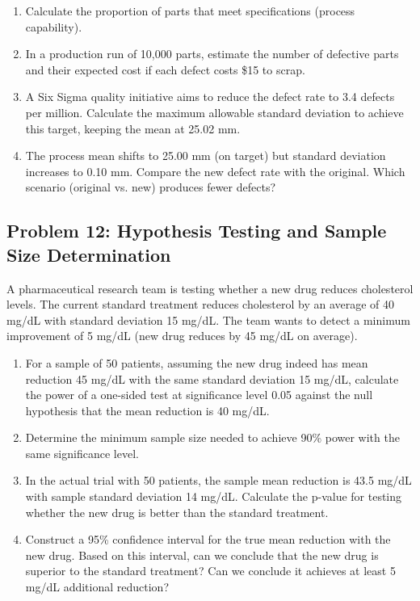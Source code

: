 \documentclass[12pt]{article}
\begin{document}
\begin{enumerate}[label=(\alph*)]
\item Calculate the proportion of parts that meet specifications (process capability).

\item In a production run of 10,000 parts, estimate the number of defective parts and their expected cost if each defect costs \$15 to scrap.

\item A Six Sigma quality initiative aims to reduce the defect rate to 3.4 defects per million. Calculate the maximum allowable standard deviation to achieve this target, keeping the mean at 25.02 mm.

\item The process mean shifts to 25.00 mm (on target) but standard deviation increases to 0.10 mm. Compare the new defect rate with the original. Which scenario (original vs. new) produces fewer defects?
\end{enumerate}

\subsection*{Problem 12: Hypothesis Testing and Sample Size Determination}

A pharmaceutical research team is testing whether a new drug reduces cholesterol levels. The current standard treatment reduces cholesterol by an average of 40 mg/dL with standard deviation 15 mg/dL. The team wants to detect a minimum improvement of 5 mg/dL (new drug reduces by 45 mg/dL on average).

\begin{enumerate}[label=(\alph*)]
\item For a sample of 50 patients, assuming the new drug indeed has mean reduction 45 mg/dL with the same standard deviation 15 mg/dL, calculate the power of a one-sided test at significance level 0.05 against the null hypothesis that the mean reduction is 40 mg/dL.

\item Determine the minimum sample size needed to achieve 90\% power with the same significance level.

\item In the actual trial with 50 patients, the sample mean reduction is 43.5 mg/dL with sample standard deviation 14 mg/dL. Calculate the p-value for testing whether the new drug is better than the standard treatment.

\item Construct a 95\% confidence interval for the true mean reduction with the new drug. Based on this interval, can we conclude that the new drug is superior to the standard treatment? Can we conclude it achieves at least 5 mg/dL additional reduction?
\end{enumerate}
\end{document}

